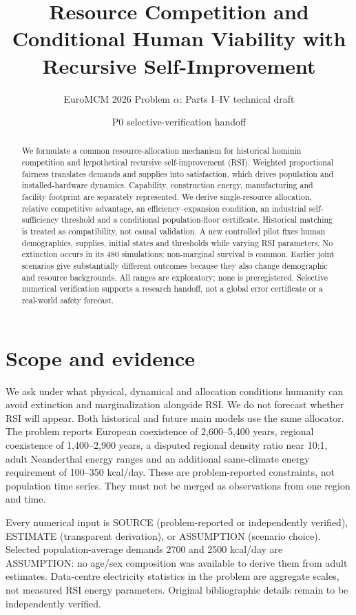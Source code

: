 \documentclass[11pt]{article}
\title{Resource Competition and Conditional Human Viability with Recursive Self-Improvement}
\author{EuroMCM 2026 Problem $\alpha$: Parts I--IV technical draft}
\date{P0 selective-verification handoff}
\begin{document}
\maketitle
\begin{abstract}
We formulate a common resource-allocation mechanism for historical hominin
competition and hypothetical recursive self-improvement (RSI). Weighted proportional
fairness translates demands and supplies into satisfaction, which drives population
and installed-hardware dynamics. Capability, construction energy, manufacturing and
facility footprint are separately represented. We derive single-resource allocation,
relative competitive advantage, an efficiency--expansion condition, an industrial
self-sufficiency threshold and a conditional population-floor certificate. Historical
matching is treated as compatibility, not causal validation. A new controlled pilot
fixes human demographics, supplies, initial states and thresholds while varying RSI
parameters. No extinction occurs in its 480 simulations; non-marginal survival is
common. Earlier joint scenarios give substantially different outcomes because they
also change demographic and resource backgrounds. All ranges are exploratory;
none is preregistered. Selective numerical verification supports a research handoff,
not a global error certificate or a real-world safety forecast.
\end{abstract}

\section{Scope and evidence}
We ask under what physical, dynamical and allocation conditions humanity can avoid
extinction and marginalization alongside RSI. We do not forecast whether RSI will
appear. Both historical and future main models use the same allocator.
The problem reports European coexistence of 2,600--5,400 years, regional coexistence
of 1,400--2,900 years, a disputed regional density ratio near 10:1, adult Neanderthal
energy ranges and an additional same-climate energy requirement of 100--350 kcal/day.
These are problem-reported constraints, not population time series. They must not
be merged as observations from one region and time.

Every numerical input is SOURCE (problem-reported or independently verified),
ESTIMATE (transparent derivation), or ASSUMPTION (scenario choice). Selected
population-average demands 2700 and 2500 kcal/day are ASSUMPTION: no age/sex
composition was available to derive them from adult estimates. Data-centre electricity
statistics in the problem are aggregate scales, not measured RSI energy parameters.
Original bibliographic details remain to be independently verified.
\end{document}
